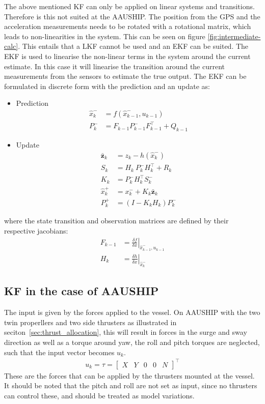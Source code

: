 The above mentioned \ac{KF} can only be applied on linear systems and transitions. Therefore is this not suited at the AAUSHIP. The position from the \ac{GPS} and the acceleration measurements needs to be rotated with a rotational matrix, which leads to non-linearities in the system. This can be seen on figure \vref{fig:intermediate-calc}. This entails that a \ac{LKF} cannot be used and an \ac{EKF} can be suited. The \ac{EKF} is used to linearise the non-linear terms in the system around the current estimate. In this case it will linearise the transition around the current measurements from the sensors to estimate the true output. The \ac{EKF} can be formulated in discrete form with the prediction and an update as:
\begin{itemize}\tightlist
\item Prediction
\begin{align}
\hat x_k^- &= f(\hat x_{k-1}^-,u_{k-1})\\
P_k^- &= F_{k-1}P_{k-1}^-F_{k-1}^\top+Q_{k-1}
\end{align}
\item Update
\begin{align}
\bar{\mathbf{z}}_k &= z_k - h(\hat x_k^-)\\
S_k &= H_k\ P_k^-H_k^\top + R_k\\
K_k &= P_k^-H_k^\top S_k^-\\
\hat x_k^+ &= x_k^- + K_k \bar{\mathbf{z}}_k\\
P_k^+ &= (I - K_k H_k) P_k^-
\end{align}
\end{itemize}
where the state transition and observation matrices are defined by their respective jacobians:
\begin{align}
F_{k-1} &= \left.\frac{\delta f}{\delta x}\right|_{\hat x_{k-1}^-,u_{k-1}}\\
H_k &= \left.\frac{\delta h}{\delta x}\right|_{\hat x_{k}^-}
\end{align}

\subsection{\acl{KF} in the case of AAUSHIP}
The input is given by the forces applied to the vessel. On AAUSHIP with the two twin properllers and two side thrusters as illustrated in seciton~\vref{sec:thrust_allocation}, this will result in forces in the surge and sway direction as well as a torque around yaw, the roll and pitch torques are neglected, such that the input vector becomes $u_k$.
\begin{align}
u_k = \tau =
\begin{bmatrix}
X & Y & 0 & 0 & N
\end{bmatrix}^\top
\end{align}
These are the forces that can be applied by the thrusters mounted at the vessel. It should be noted that the pitch and roll are not set as input, since no thrusters can control these, and should be treated as model variations.

